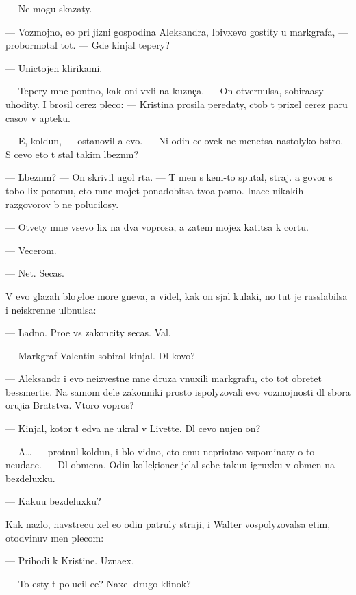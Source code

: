 \documentclass[10pt]{book}
\begin{document}
— Ne mogu skazaty.

— Vozmojno, {\y}e{\x}o pri jizni gospodina Aleksandra, l{\iu}bivxevo gostity u markgrafa, — probormotal tot. — Gde kinjal tepery?

— Unictojen klirikami.

— Tepery mne pon{\ia}tno, kak oni v{\yi}xli na kuzne{\c}a. — On otvernulsa, sobira{\y}asy uhodity. I brosil cerez pleco: — Kristina prosila peredaty, ctob{\yi} t{\yi} prixel cerez paru casov v apteku.

— E{\y}, koldun, — ostanovil {\y}a {\y}evo. — Ni odin celovek ne men{\ia}{\y}etsa nastolyko b{\yi}stro. S cevo eto t{\yi} stal takim l{\iu}bezn{\yi}m?

— L{\iu}bezn{\yi}m? — On skrivil ugol rta. — T{\yi} men{\ia} s kem-to sputal, straj. {\Y}a govor{\iu} s tobo{\y} lix potomu, cto mne mojet ponadobitsa tvo{\y}a pomo{\x}. Inace nikakih razgovorov b{\yi} ne polucilosy.

— Otvety mne vsevo lix na dva voprosa, a zatem mojex katitsa k cortu.

— Vecerom.

— Net. Se{\y}cas.

V {\y}evo glazah b{\yi}lo {\c}elo{\y}e more gneva, {\y}a videl, kak on sjal kulaki, no tut je rasslabilsa i ne{\y}iskrenne ul{\yi}bnulsa:

— Ladno. Pro{\x}e vs{\e} zakoncity se{\y}cas. Val{\ia}{\y}.

— Markgraf Valentin sobiral kinjal{\yi}. Dl{\ia} kovo?

— Aleksandr i {\y}evo ne{\y}izvestn{\yi}{\y}e mne druz{\y}a vnuxili markgrafu, cto tot obretet bessmerti{\y}e. Na samom dele zakonniki prosto ispolyzovali {\y}evo vozmojnosti dl{\ia} sbora oruji{\y}a Bratstva. Vtoro{\y} vopros?

— Kinjal, kotor{\yi}{\y} t{\yi} {\y}edva ne ukral v Livette. Dl{\ia} cevo nujen on?

— A… — prot{\ia}nul koldun, i b{\yi}lo vidno, cto {\y}emu nepri{\y}atno vspominaty o to{\y} neudace. — Dl{\ia} obmena. Odin kollek{\c}ioner jelal sebe taku{\y}u igruxku v obmen na bezdeluxku.

— Kaku{\y}u bezdeluxku?

Kak nazlo, navstrecu xel {\y}e{\x}o odin patruly straji, i Walter vospolyzovalsa etim, otodvinuv men{\ia} plecom:

— Prihodi k Kristine. Uzna{\y}ex.

— To {\y}esty t{\yi} polucil {\y}e{\y}e? Naxel drugo{\y} klinok?
\end{document}
